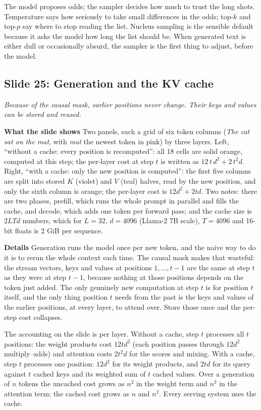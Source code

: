 \documentclass[11pt,letterpaper]{article}
\newcommand{\slide}[3]{%
  \subsection[Slide #1: #2]{Slide #1: #2}%
  {\color{muted}\itshape #3\par}\medskip}
\newcommand{\para}[1]{\medskip\noindent\textbf{#1}\quad}
\newenvironment{intuition}{\begin{tcolorbox}[intuitionbox]}{\end{tcolorbox}}
\begin{document}
\begin{intuition}
The model proposes odds; the sampler decides how much to trust the long shots. Temperature says how seriously to take small differences in the odds; top-$k$ and top-$p$ say where to stop reading the list. Nucleus sampling is the sensible default because it asks the model how long the list should be. When generated text is either dull or occasionally absurd, the sampler is the first thing to adjust, before the model.
\end{intuition}

\slide{25}{Generation and the KV cache}{Because of the causal mask, earlier positions never change. Their keys and values can be stored and reused.}

\para{What the slide shows} Two panels, each a grid of six token columns (\emph{The cat sat on the mat}, with \emph{mat} the newest token in pink) by three layers. Left, ``without a cache: every position is recomputed'': all 18 cells are solid orange, computed at this step; the per-layer cost at step $t$ is written as $12\,t\,d^2+2\,t^2d$. Right, ``with a cache: only the new position is computed'': the first five columns are split into stored $K$ (violet) and $V$ (teal) halves, read by the new position, and only the sixth column is orange; the per-layer cost is $12d^2+2td$. Two notes: there are two phases, prefill, which runs the whole prompt in parallel and fills the cache, and decode, which adds one token per forward pass; and the cache size is $2LTd$ numbers, which for $L=32$, $d=4096$ (Llama-2 7B scale), $T=4096$ and 16-bit floats is 2 GiB per sequence.

\para{Details} Generation runs the model once per new token, and the naive way to do it is to rerun the whole context each time. The causal mask makes that wasteful: the stream vectors, keys and values at positions $1,\dots,t-1$ are the same at step $t$ as they were at step $t-1$, because nothing at those positions depends on the token just added. The only genuinely new computation at step $t$ is for position $t$ itself, and the only thing position $t$ needs from the past is the keys and values of the earlier positions, at every layer, to attend over. Store those once and the per-step cost collapses.

The accounting on the slide is per layer. Without a cache, step $t$ processes all $t$ positions: the weight products cost $12td^2$ (each position passes through $12d^2$ multiply--adds) and attention costs $2t^2d$ for the scores and mixing. With a cache, step $t$ processes one position: $12d^2$ for its weight products, and $2td$ for its query against $t$ cached keys and its weighted sum of $t$ cached values. Over a generation of $n$ tokens the uncached cost grows as $n^2$ in the weight term and $n^3$ in the attention term; the cached cost grows as $n$ and $n^2$. Every serving system uses the cache.
\end{document}
